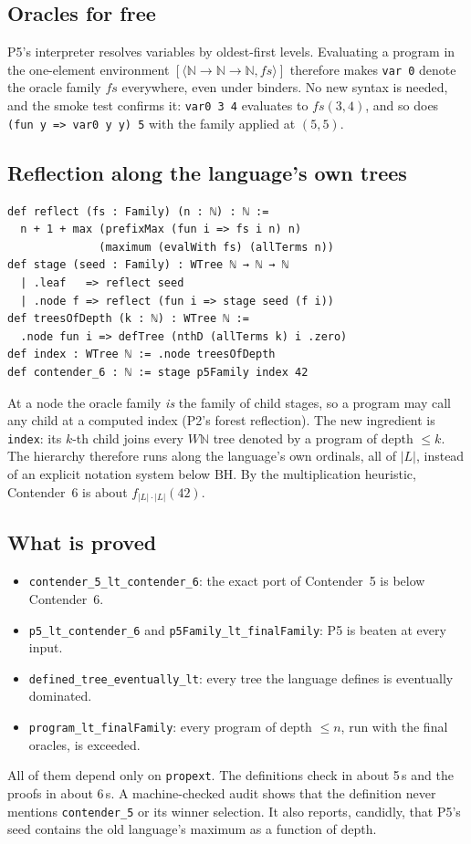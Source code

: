 \documentclass[11pt]{article}
\theoremstyle{definition}
\theoremstyle{remark}
\newcommand{\N}{\mathbb{N}}
\newcommand{\lean}[1]{\texttt{#1}}
\newcommand{\BH}{\ensuremath{\mathrm{BH}}}
\begin{document}
\subsection{Oracles for free}
P5's interpreter resolves variables by oldest-first levels. Evaluating a program
in the one-element environment $[\langle \N\to\N\to\N, fs\rangle]$ therefore makes
\lean{var 0} denote the oracle family $fs$ everywhere, even under binders. No new
syntax is needed, and the smoke test confirms it: \lean{var0 3 4} evaluates to
$fs(3,4)$, and so does \lean{(fun y => var0 y y) 5} with the family applied at
$(5,5)$.

\subsection{Reflection along the language's own trees}
\begin{lstlisting}
def reflect (fs : Family) (n : ℕ) : ℕ :=
  n + 1 + max (prefixMax (fun i => fs i n) n)
              (maximum (evalWith fs) (allTerms n))
def stage (seed : Family) : WTree ℕ → ℕ → ℕ
  | .leaf   => reflect seed
  | .node f => reflect (fun i => stage seed (f i))
def treesOfDepth (k : ℕ) : WTree ℕ :=
  .node fun i => defTree (nthD (allTerms k) i .zero)
def index : WTree ℕ := .node treesOfDepth
def contender_6 : ℕ := stage p5Family index 42
\end{lstlisting}
At a node the oracle family \emph{is} the family of child stages, so a program
may call any child at a computed index (P2's forest reflection). The new
ingredient is \lean{index}: its $k$-th child joins every $W\N$ tree denoted by a
program of depth $\le k$. The hierarchy therefore runs along the language's own
ordinals, all of $|L|$, instead of an explicit notation system below \BH. By the
multiplication heuristic, Contender~6 is about $f_{|L|\cdot|L|}(42)$.

\subsection{What is proved}
\begin{itemize}[leftmargin=*]
\item \lean{contender\_5\_lt\_contender\_6}: the exact port of Contender~5 is below Contender~6.
\item \lean{p5\_lt\_contender\_6} and \lean{p5Family\_lt\_finalFamily}: P5 is beaten at every input.
\item \lean{defined\_tree\_eventually\_lt}: every tree the language defines is eventually dominated.
\item \lean{program\_lt\_finalFamily}: every program of depth $\le n$, run with the final oracles, is exceeded.
\end{itemize}
All of them depend only on \lean{propext}. The definitions check in about 5\,s
and the proofs in about 6\,s. A machine-checked audit shows that the definition
never mentions \lean{contender\_5} or its winner selection. It also reports,
candidly, that P5's seed contains the old language's maximum as a function of
depth.
\end{document}
